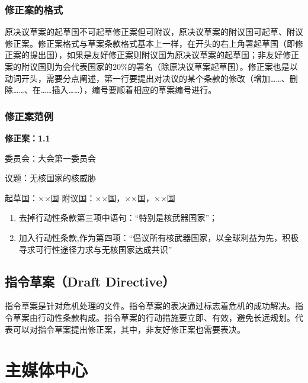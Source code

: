 \documentclass[a4paper,openany]{book}
\begin{document}
\subsection{修正案的格式}

原决议草案的起草国不可起草修正案但可附议，原决议草案的附议国可起草、附议修正案。修正案格式与草案条款格式基本上一样，在开头的右上角署起草国（即修正案的提出国），如果是友好修正案则附议国为原决议草案的起草国；非友好修正案的附议国则为会代表国家的20\%的署名（除原决议草案起草国）。修正案也是以动词开头，需要分点阐述，第一行要提出对决议的某个条款的修改（增加……、删除……、在……插入……），编号要顺着相应的草案编号进行。

\subsection{修正案范例}
\begin{spacing}{1}
\setlength{\parskip}{0em}
\centerline{\textbf{修正案：1.1}}

\vspace{1em}

\noindent 委员会：大会第一委员会 

\noindent 议题：无核国家的核威胁 

\noindent 起草国：××国 附议国：××国，××国，××国 

\begin{enumerate}
\setlength{\itemsep}{0pt}
\setlength{\parsep}{0pt}
\setlength{\parskip}{0pt}

\item 去掉行动性条款第三项中语句：“特别是核武器国家”； 

\item 加入行动性条款,作为第四项：“倡议所有核武器国家，以全球利益为先，积极寻求可行性途径力求与无核国家达成共识”

\end{enumerate}
\end{spacing}

\section{指令草案（Draft Directive）}

指令草案是针对危机处理的文件。指令草案的表决通过标志着危机的成功解决。指令草案由行动性条款构成。指令草案的行动措施要立即、有效，避免长远规划。代表可以对指令草案提出修正案，其中，非友好修正案也需要表决。

\chapter{主媒体中心}
\end{document}
